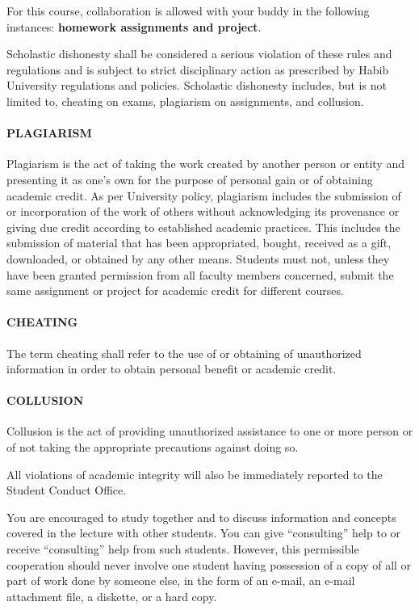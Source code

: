 \documentclass[a4paper]{article}
\begin{document}
For this course, collaboration is allowed with your buddy in the following instances: \textbf{homework assignments and project}.

Scholastic dishonesty shall be considered a serious violation of these rules and regulations and is subject to strict disciplinary action as prescribed by Habib University regulations and policies. Scholastic dishonesty includes, but is not limited to, cheating on exams, plagiarism on assignments, and collusion. 

\paragraph{PLAGIARISM} Plagiarism is the act of taking the work created by another person or entity and presenting it as one’s own for the purpose of personal gain or of obtaining academic credit. As per University policy, plagiarism includes the submission of or incorporation of the work of others without acknowledging its provenance or giving due credit according to established academic practices. This includes the submission of material that has been appropriated, bought, received as a gift, downloaded, or obtained by any other means. Students must not, unless they have been granted permission from all faculty members concerned, submit the same assignment or project for academic credit for different courses. 

\paragraph{CHEATING} The term cheating shall refer to the use of or obtaining of unauthorized information in order to obtain personal benefit or academic credit. 

\paragraph{COLLUSION} Collusion is the act of providing unauthorized assistance to one or more person or of not taking the appropriate precautions against doing so.

All violations of academic integrity will also be immediately reported to the Student Conduct Office.  

You are encouraged to study together and to discuss information and concepts covered in the lecture with other students. You can give ``consulting'' help to or receive ``consulting'' help from such students. However, this permissible cooperation should never involve one student having possession of a copy of all or part of work done by someone else, in the form of an e-mail, an e-mail attachment file, a diskette, or a hard copy. 
\end{document}
